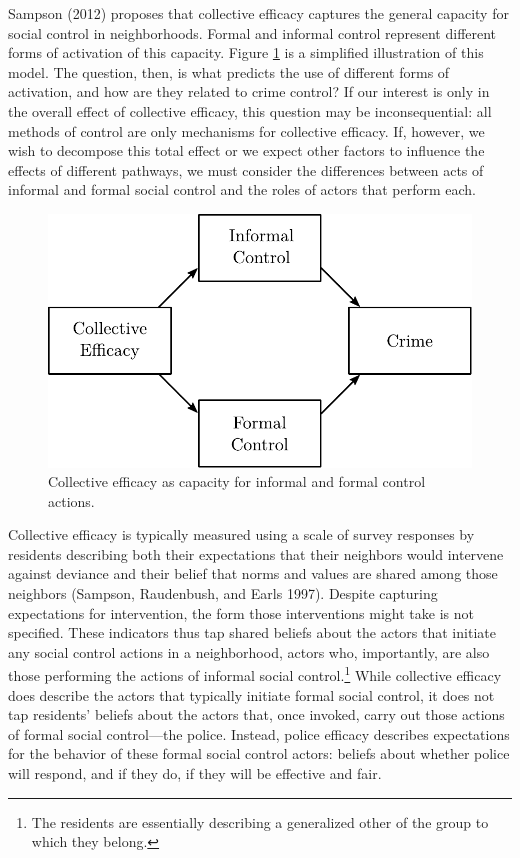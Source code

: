 \documentclass [11pt, proquest] {uwthesis}[2015/03/03]
\begin{document}
Sampson (2012) proposes that collective efficacy captures the general capacity for social control in neighborhoods. Formal and informal control represent different forms of activation of this capacity. Figure \ref{fig:controldiagram} is a simplified illustration of this model. The question, then, is what predicts the use of different forms of activation, and how are they related to crime control? If our interest is only in the overall effect of collective efficacy, this question may be inconsequential: all methods of control are only mechanisms for collective efficacy. If, however, we wish to decompose this total effect or we expect other factors to influence the effects of different pathways, we must consider the differences between acts of informal and formal social control and the roles of actors that perform each.\linebreak
\linebreak
\begin{figure}

{\centering \includegraphics[width=0.6\linewidth]{./figure/ch3/ce_pe_framework} 

}

\caption{Collective efficacy as capacity for informal and formal control actions.}\label{fig:controldiagram}
\end{figure}
Collective efficacy is typically measured using a scale of survey responses by residents describing both their expectations that their neighbors would intervene against deviance and their belief that norms and values are shared among those neighbors (Sampson, Raudenbush, and Earls 1997). Despite capturing expectations for intervention, the form those interventions might take is not specified. These indicators thus tap shared beliefs about the actors that initiate any social control actions in a neighborhood, actors who, importantly, are also those performing the actions of informal social control.\footnote{The residents are essentially describing a generalized other of the group to which they belong.} While collective efficacy does describe the actors that typically initiate formal social control, it does not tap residents' beliefs about the actors that, once invoked, carry out those actions of formal social control---the police. Instead, police efficacy describes expectations for the behavior of these formal social control actors: beliefs about whether police will respond, and if they do, if they will be effective and fair.
\end{document}
